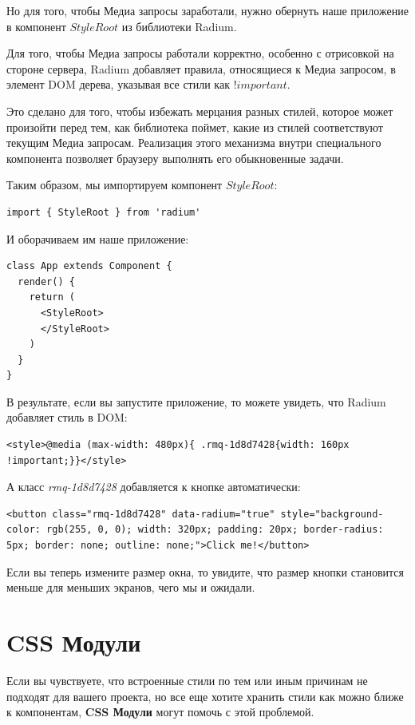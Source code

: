 Но для того, чтобы Медиа запросы заработали, нужно обернуть наше приложение в компонент $StyleRoot$ из библиотеки Radium.

Для того, чтобы Медиа запросы работали корректно, особенно с отрисовкой на стороне сервера, Radium добавляет правила, относящиеся к Медиа запросом, в элемент DOM дерева, указывая все стили как $!important$.

Это сделано для того, чтобы избежать мерцания разных стилей, которое может произойти перед тем, как библиотека поймет, какие из стилей соответствуют текущим Медиа запросам. Реализация этого механизма внутри специального компонента позволяет браузеру выполнять его обыкновенные задачи.

Таким образом, мы импортируем компонент $StyleRoot$:

\begin{lstlisting}
import { StyleRoot } from 'radium'
\end{lstlisting}

И оборачиваем им наше приложение:

\begin{lstlisting}
class App extends Component {
  render() {
    return (
      <StyleRoot>
      </StyleRoot>
    )
  }
}
\end{lstlisting}

В результате, если вы запустите приложение, то можете увидеть, что Radium добавляет стиль в DOM:

\begin{lstlisting}
<style>@media (max-width: 480px){ .rmq-1d8d7428{width: 160px !important;}}</style>
\end{lstlisting}

А класс \textit{rmq-1d8d7428} добавляется к кнопке автоматически:

\begin{lstlisting}
<button class="rmq-1d8d7428" data-radium="true" style="background-color: rgb(255, 0, 0); width: 320px; padding: 20px; border-radius: 5px; border: none; outline: none;">Click me!</button>	
\end{lstlisting}

Если вы теперь измените размер окна, то увидите, что размер кнопки становится меньше для меньших экранов, чего мы и ожидали.

\section{CSS Модули}

Если вы чувствуете, что встроенные стили по тем или иным причинам не подходят для вашего проекта, но все еще хотите хранить стили как можно ближе к компонентам, \textbf{CSS Модули} могут помочь с этой проблемой.

